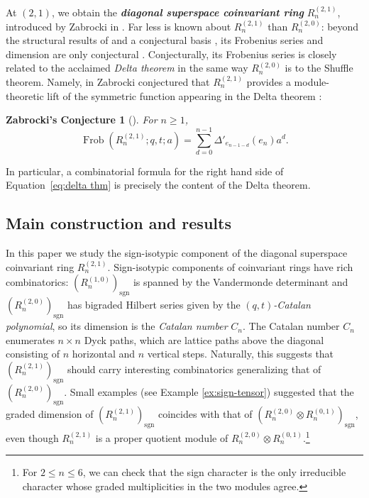 \documentclass[11pt, noadjust, reqno]{amsart}
\newtheorem*{zconjecture*}{Zabrocki's Conjecture}
\theoremstyle{definition}
\theoremstyle{remark}
\numberwithin{equation}{section}
\newcommand{\0}{\emptyset}
\DeclareMathOperator{\Frob}{Frob}
\DeclareMathOperator{\sgn}{sgn}
\newcommand{\newword}[1]{\emph{\textbf{#1}}}
\begin{document}
At $(2,1)$, we obtain the \newword{diagonal superspace coinvariant ring} $R_n^{(2,1)}$, introduced by Zabrocki in \cite{Zabrocki2019}.
Far less is known about $R_n^{(2,1)}$ than $R_n^{(2,0)}$: beyond the structural results of \cite{Bergeron2020,Lentfer-Supersymmetry} and a conjectural basis \cite{HaglundSergel}, its Frobenius series and dimension are only conjectural \cite{Zabrocki2019}.
Conjecturally, its Frobenius series is closely related to the acclaimed \emph{Delta theorem} in the same way $R_n^{(2,0)}$ is to the Shuffle theorem. 
Namely, in \cite{Zabrocki2019} Zabrocki conjectured that $R_n^{(2,1)}$ provides a module-theoretic lift of the symmetric function appearing in the Delta theorem \cite{HaglundRemmelWilson2018, DAdderioMellit}:
\begin{zconjecture*}[\cite{Zabrocki2019}]
For $n \geq 1$,
    \begin{equation}\label{eq:delta thm}
        \Frob(R_n^{(2,1)}; q,t; a) = \sum_{d=0}^{n-1} \Delta'_{e_{n-1-d}}(e_n) a^d.
    \end{equation}
\end{zconjecture*}
\noindent In particular, a combinatorial formula for the right hand side of Equation~\eqref{eq:delta thm} is precisely the content of the Delta theorem. 

\subsection{Main construction and results} In this paper we study the sign-isotypic component of the diagonal superspace coinvariant ring $R_n^{(2,1)}$. 
Sign-isotypic components of coinvariant rings have rich combinatorics: $(R_n^{(1,0)})_{\sgn}$ is spanned by the Vandermonde determinant and $(R_n^{(2,0)})_{\sgn}$ has bigraded Hilbert series given by the \emph{$(q,t)$-Catalan polynomial}, so its dimension is the \emph{Catalan number} $C_n$. 
The Catalan number $C_n$ enumerates $n\times n$ Dyck paths, which are lattice paths above the diagonal consisting of $n$ horizontal and $n$ vertical steps. Naturally, this suggests that $(R_n^{(2,1)})_{\sgn}$ should carry interesting combinatorics generalizing that of $(R_n^{(2,0)})_{\sgn}$.
Small examples (see Example \ref{ex:sign-tensor}) suggested that the graded dimension of $(R_n^{(2,1)})_{\sgn}$ coincides with that of $(R_n^{(2,0)} \otimes R_n^{(0,1)})_{\sgn}$, even though $R_n^{(2,1)}$ is a proper quotient module of $R_n^{(2,0)} \otimes R_n^{(0,1)}$.\footnote{For $2 \leq n \leq 6$, we can check that the sign character is the only irreducible character whose graded multiplicities in the two modules agree.}
\end{document}
